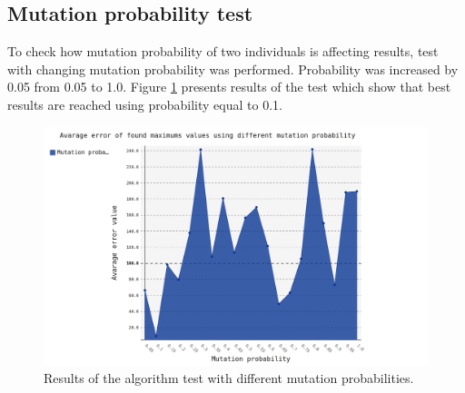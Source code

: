 \documentclass[a4paper]{article}
\begin{document}
\subsection{Mutation probability test}
To check how mutation probability of two individuals is affecting results, test with changing mutation probability was performed. 
Probability was increased by 0.05 from 0.05 to 1.0. Figure \ref{mutation} presents results of the test which show that best results are reached using probability equal to 0.1.
\vfill
\begin{figure}[ht]
	\centering
	\includegraphics[scale=0.36,keepaspectratio=true]{mutation.png}	
	\caption{Results of the algorithm test with different mutation probabilities.}
	\label{mutation}
\end{figure}
\vfill
\clearpage
\end{document}
